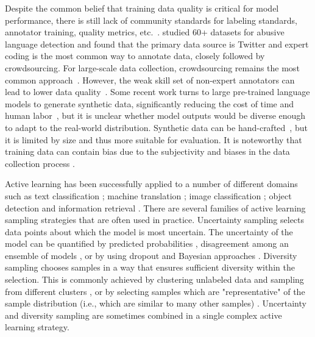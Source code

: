 \documentclass[letterpaper]{article} %
\begin{document}
Despite the common belief that training data quality is critical for model performance, there is still lack of community standards for labeling standards, annotator training, quality metrics, etc.~\cite{vidgen2020garbage, yin2021hatereview, lees2022perspective,pai2021}. \citet{vidgen2020garbage} studied 60+ datasets for abusive language detection and found that the primary data source is Twitter and expert coding is the most common way to annotate data, closely followed by crowdsourcing. For large-scale data collection, crowdsourcing remains the most common approach~\cite{ethos,zampieri2019toxic,davidson2017automated}. However, the weak skill set of non-expert annotators can lead to lower data quality~\cite{waseem2016racist,yin2021hatereview}. Some recent work turns to large pre-trained language models to generate synthetic data, significantly reducing the cost of time and human labor~\cite{wang2021gpt3help,hartvigsen2022toxigen}, but it is unclear whether model outputs would be diverse enough to adapt to the real-world distribution. Synthetic data can be hand-crafted~\cite{hatecheck}, but it is limited by size and thus more suitable for evaluation. It is noteworthy that training data can contain bias due to the subjectivity and biases in the data collection process \cite{davidson2019bias, sap2019bias}.

Active learning has been successfully applied to a number of different domains such as text classification \cite{lewis1994sequential,schohn2000less,siddhant-lipton-2018-deep}; machine translation \cite{zeng2019empirical}; image classification \cite{luo2005active,hoi2006batch,gal2017deep}; object detection \cite{schmidt2020advanced} and information retrieval \cite{shen2005active}. There are several families of active learning sampling strategies that are often used in practice. Uncertainty sampling selects data points about which the model is most uncertain. The uncertainty of the model can be quantified by predicted probabilities \cite{lewis1994sequential,lewis1994heterogeneous,culotta2005reducing,scheffer2001active}, disagreement among an ensemble of models \cite{seung1992query,dagan1995committee,mccallum1998em}, or by using dropout and Bayesian approaches \cite{gal2017deep, siddhant-lipton-2018-deep}. Diversity sampling chooses samples in a way that ensures sufficient diversity within the selection. This is commonly achieved by clustering unlabeled data and sampling from different clusters \cite{nguyen2004active,xu2007incorporating}, or by selecting samples which are "representative" of the sample distribution (i.e., which are similar to many other samples) \cite{mccallum1998em,settles2008analysis}. Uncertainty and diversity sampling are sometimes combined in a single complex active learning strategy.
\end{document}
